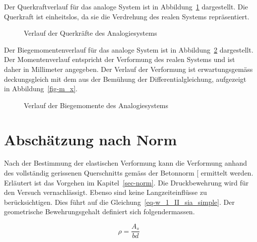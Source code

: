 \documentclass[
  12pt,
  letterpaper,
  egregdoesnotlikesansseriftitles]{scrreprt}
\begin{document}
Der Querkraftverlauf für das analoge System ist in
Abbildung~\ref{fig-v_x_mohr} dargestellt. Die Querkraft ist einheitslos,
da sie die Verdrehung des realen Systems repräsentiert.

\begin{figure}[H]


\caption{\label{fig-v_x_mohr}Verlauf der Querkräfte des Analogiesystems}

\end{figure}%

Der Biegemomentenverlauf für das analoge System ist in
Abbildung~\ref{fig-m_x_mohr} dargestellt. Der Momentenverlauf entspricht
der Verformung des realen Systems und ist daher in Millimeter angegeben.
Der Verlauf der Verformung ist erwartungsgemäss deckungsgleich mit dem
aus der Bemühung der Differentialgleichung, aufgezeigt in
Abbildung~\ref{fig-m_x}.

\begin{figure}[H]


\caption{\label{fig-m_x_mohr}Verlauf der Biegemomente des
Analogiesystems}

\end{figure}%

\section{Abschätzung nach Norm}\label{abschuxe4tzung-nach-norm}

Nach der Bestimmung der elastischen Verformung kann die Verformung
anhand des vollständig gerissenen Querschnitts gemäss der Betonnorm
{[}\citeproc{ref-SIA2013a}{6}{]} ermittelt werden. Erläutert ist das
Vorgehen im Kapitel~\ref{sec-norm}. Die Druckbewehrung wird für den
Versuch vernachlässigt. Ebenso sind keine Langzeiteinflüsse zu
berücksichtigen. Dies führt auf die
Gleichung~\ref{eq-w_1_II_sia_simple}. Der geometrische Bewehrungsgehalt
definiert sich folgendermassen.

\begin{equation}\rho = \frac{A_{s}}{b d}\end{equation}
\end{document}
